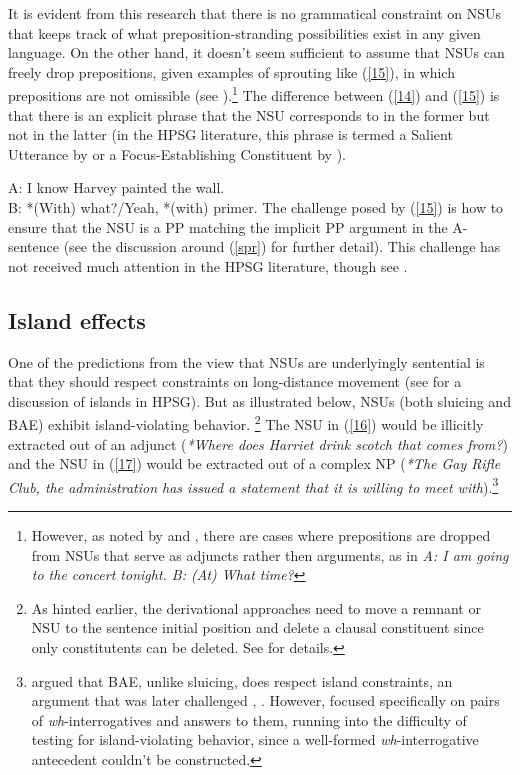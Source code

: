 {It is evident from this research that there is no grammatical constraint on NSUs that keeps track of what preposition-stranding possibilities exist in any given language. On the other hand, it doesn't seem sufficient to assume that NSUs can freely drop prepositions, given examples of sprouting like (\ref{15}), in which prepositions are not omissible (see \citealt{Chung1995}).\footnote{However, as noted by \citet{Ginzburg:Sag:2000} and \citet{Hardt2020}, there are cases where prepositions are dropped from NSUs that serve as adjuncts rather then arguments, as in \textit{A: I am going to the concert tonight. B: (At) What time?}}  The difference between (\ref{14}) and (\ref{15}) is that there is an explicit phrase that the NSU corresponds to in the former but not in the latter (in the HPSG literature, this phrase is termed a Salient Utterance by \citealt[313]{Ginzburg:Sag:2000} or a Focus-Establishing Constituent by \citealt{Ginzburg2012}). 

\ea A: I know Harvey painted the wall.\\B: *(With) what?/Yeah, *(with) primer.\label{15}\z
%
The challenge posed by (\ref{15}) is how to ensure that
the NSU is a PP matching the implicit PP argument in 
the A-sentence (see the discussion
around %
(\ref{spr}) for further detail). This challenge has not received much attention in the HPSG literature, though see \citet{Kim2015}.



\subsection{Island effects}
\label{sec-island-effects}

One of the predictions from the view that NSUs are underlyingly sentential is that they should respect  constraints on long-distance movement (see  for a discussion of islands in HPSG). But as illustrated below, NSUs (both sluicing and BAE) exhibit island-violating behavior.%
\footnote{As hinted earlier, the derivational approaches
need to move a remnant or NSU to the sentence initial position and delete a clausal constituent since only constitutents can be deleted. See \citet{Merchant2001,Merchant2010} for details.} The NSU  in (\ref{16}) would be illicitly extracted out of an adjunct (\textit{*Where does Harriet drink scotch that comes from?}) and the NSU  in (\ref{17}) would be extracted out of a complex NP (\textit{*The Gay Rifle Club, the administration has issued a statement that it is willing to meet with}).\footnote{\citet{Merchant2005a} argued that BAE, unlike sluicing, does respect island constraints, an argument that was later challenged \citep[see, e.g.,][239]{CJ2005a}, \citealt{Griffiths2014}. However, \citet{Merchant2005a} focused specifically on pairs of \emph{wh}-interrogatives and answers to them, running into the difficulty of testing for island-violating behavior, since a well-formed \emph{wh}-interrogative antecedent couldn't be constructed.}

}
